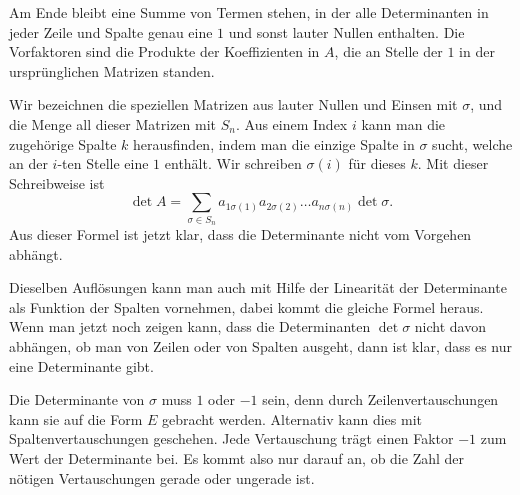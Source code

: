 Am Ende bleibt eine Summe von Termen stehen, in der alle Determinanten
in jeder Zeile und Spalte genau eine $1$ und sonst lauter Nullen
enthalten.
Die Vorfaktoren sind die Produkte der Koeffizienten in $A$,
die an Stelle der $1$ in der ursprünglichen Matrizen standen.

Wir bezeichnen die speziellen Matrizen aus lauter Nullen und Einsen
mit $\sigma$, und die Menge all dieser Matrizen mit $S_n$.
Aus einem
Index $i$ kann man die zugehörige Spalte $k$ herausfinden, indem
man die einzige Spalte in $\sigma$ sucht, welche an der $i$-ten
Stelle eine $1$ enthält.
Wir schreiben $\sigma(i)$ für dieses $k$.
Mit dieser Schreibweise ist 
\[
\det A=\sum_{\sigma\in S_n}
a_{1\sigma(1)}
a_{2\sigma(2)}
\dots
a_{n\sigma(n)}
\det \sigma.
\]
Aus dieser Formel ist jetzt klar, dass die Determinante nicht vom
Vorgehen abhängt.

Dieselben Auflösungen kann man auch mit Hilfe der Linearität der
Determinante als Funktion der Spalten vornehmen, dabei kommt die 
gleiche Formel heraus.
Wenn man jetzt noch zeigen kann, dass
die Determinanten $\det\sigma$ nicht davon abhängen, ob man von
Zeilen oder von Spalten ausgeht, dann ist klar, dass es nur eine
Determinante gibt.

Die Determinante von $\sigma$ muss $1$ oder $-1$ sein, denn durch
Zeilenvertauschungen kann sie auf die Form $E$ gebracht werden.
Alternativ kann dies mit Spaltenvertauschungen geschehen.
Jede Vertauschung trägt einen Faktor $-1$ zum Wert der Determinante bei.
Es kommt also nur darauf an, ob die Zahl der nötigen
Vertauschungen gerade oder ungerade ist.
